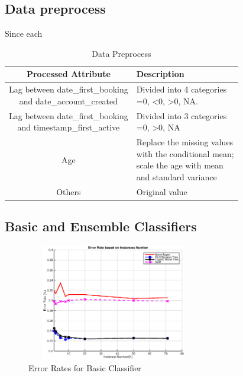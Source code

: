 \documentclass{sig-alternate-05-2015}
\begin{document}
\subsection{Data preprocess}
Since each 


\begin{table}[!htb]
\centering
\caption{Data Preprocess}
\label{table:preprocess}
\begin{tabular}{|c|l|} \hline
Processed Attribute & Description\\ \hline
\shortstack{Lag between date\_first\_booking \\ and date\_account\_created} & 
\shortstack[l]{Divided into 4 categories\: \\ =0, <0, >0, NA.}\\ \hline
\shortstack{Lag between date\_first\_booking \\ and timestamp\_first\_active} & 
\shortstack[l]{Divided into 3 categories\: \\ =0, >0, NA}\\ \hline
Age & 
\shortstack[l]{Replace the missing values \\
with the conditional mean; \\
scale the age with mean \\
and standard variance} \\ \hline
Others & Original value \\
\hline\end{tabular}
\end{table}


\subsection{Basic and Ensemble Classifiers}

\begin{figure}
\centering
\includegraphics[height=2in, width=3in]{Basic_Classifiers}
\caption{Error Rates for Basic Classifier}
\label{fig:basic classifier}
\end{figure}
\end{document}
